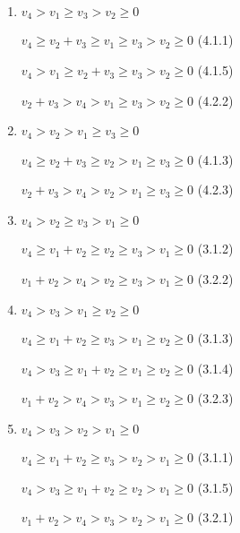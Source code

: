 \documentclass{article}
\begin{document}
\begin{enumerate}
    \item $v_4>v_1\geq{v_3}>v_2\geq{0}$

    $v_4\geq{v_2+v_3}\geq{v_1}\geq{v_3}>v_2\geq{0}$ (4.1.1)

    $v_4>v_1\geq{v_2+v_3}\geq{v_3}>v_2\geq{0}$ (4.1.5)

    $v_2+v_3>v_4>v_1\geq{v_3}>v_2\geq{0}$ (4.2.2)

    \item $v_4>v_2>v_1\geq{v_3}\geq{0}$

    $v_4\geq{v_2+v_3}\geq{v_2}>v_1\geq{v_3}\geq{0}$ (4.1.3)

    $v_2+v_3>v_4>v_2>v_1\geq{v_3}\geq{0}$ (4.2.3)

    \item $v_4>v_2\geq{v_3}>v_1\geq{0}$

    $v_4\geq{v_1+v_2}\geq{v_2}\geq{v_3}>v_1\geq{0}$ (3.1.2)

    $v_1+v_2>v_4>v_2\geq{v_3}>v_1\geq{0}$ (3.2.2)

    \item $v_4>v_3>v_1\geq{v_2}\geq{0}$

    $v_4\geq{v_1+v_2}\geq{v_3}>v_1\geq{v_2}\geq{0}$ (3.1.3)

    $v_4>v_3\geq{v_1+v_2}\geq{v_1}\geq{v_2}\geq{0}$ (3.1.4)

    $v_1+v_2>v_4>v_3>v_1\geq{v_2}\geq{0}$ (3.2.3)

    \item $v_4>v_3>v_2>v_1\geq{0}$

    $v_4\geq{v_1+v_2}\geq{v_3}>v_2>v_1\geq{0}$ (3.1.1)

    $v_4>v_3\geq{v_1+v_2}\geq{v_2}>v_1\geq{0}$ (3.1.5)

    $v_1+v_2>v_4>v_3>v_2>v_1\geq{0}$ (3.2.1)






    
    
\end{enumerate}
\end{document}
